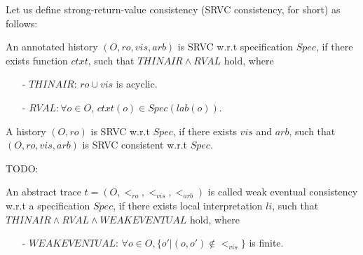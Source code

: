 Let us define strong-return-value consistency (SRVC consistency, for short) as follows:


\begin{definition}
\label{definition:strong return value consistency}
An annotated history $(O,\mathit{ro},\mathit{vis},\mathit{arb})$ is SRVC w.r.t specification $Spec$, if there exists function $ctxt$, such that $\mathit{THINAIR} \wedge \mathit{RVAL}$ hold, where

\begin{itemize}
\setlength{\itemsep}{0.5pt}
\item[-] $\mathit{THINAIR}$: $\mathit{ro} \cup \mathit{vis}$ is acyclic.

\item[-] $\mathit{RVAL}: \forall o \in O$, $ctxt(o) \in Spec(lab(o))$.
\end{itemize}

A history $(O,\mathit{ro})$ is SRVC w.r.t $Spec$, if there exists $\mathit{vis}$ and $\mathit{arb}$, such that $(O,\mathit{ro},\mathit{vis},\mathit{arb})$ is SRVC consistent w.r.t $Spec$.
\end{definition}


{\color {blue}TODO:

\begin{definition}
\label{definition:eventual consistency}
An abstract trace $t = (O,<_{\mathit{ro}},<_{\mathit{vis}},<_{\mathit{arb}})$ is called weak eventual consistency w.r.t a specification $Spec$, if there exists local interpretation $li$, such that $\mathit{THINAIR} \wedge \mathit{RVAL} \wedge \mathit{WEAKEVENTUAL}$ hold, where

\begin{itemize}
\setlength{\itemsep}{0.5pt}
\item[-] $\mathit{WEAKEVENTUAL}$: $\forall o \in O, \{ o' \vert (o,o') \notin <_{\mathit{vis}} \}$ is finite.
\end{itemize}
\end{definition}

}














